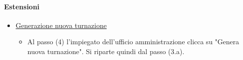 \paragraph{Estensioni}
\begin{itemize}
	\item \underline{Generazione nuova turnazione}
		\begin{itemize}
			\item Al passo (4) l'impiegato dell'ufficio amministrazione clicca su "Genera nuova turnazione". Si riparte quindi dal passo (3.a).
		\end{itemize}
\end{itemize}